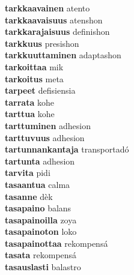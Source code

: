 \textbf{tarkkaavainen } atento \\
\textbf{tarkkaavaisuus } atenshon \\
\textbf{tarkkarajaisuus } definishon \\
\textbf{tarkkuus } presishon \\
\textbf{tarkkuuttaminen } adaptashon \\
\textbf{tarkoittaa } mik \\
\textbf{tarkoitus } meta \\
\textbf{tarpeet } defisiensia \\
\textbf{tarrata } kohe \\
\textbf{tarttua } kohe \\
\textbf{tarttuminen } adhesion \\
\textbf{tarttuvuus } adhesion \\
\textbf{tartunnankantaja } transportadó \\
\textbf{tartunta } adhesion \\
\textbf{tarvita } pidi \\
\textbf{tasaantua } calma \\
\textbf{tasanne } dèk \\
\textbf{tasapaino } balans \\
\textbf{tasapainoilla } zoya \\
\textbf{tasapainoton } loko \\
\textbf{tasapainottaa } rekompensá \\
\textbf{tasata } rekompensá \\
\textbf{tasauslasti } balastro \\
